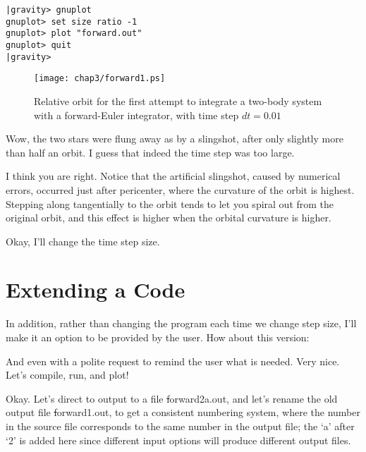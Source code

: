 \cba

\begin{small}
\begin{verbatim}
|gravity> gnuplot
gnuplot> set size ratio -1
gnuplot> plot "forward.out"
gnuplot> quit
|gravity> 
\end{verbatim}
\end{small}

\begin{figure}[ht]
\centering
\texttt{[image: chap3/forward1.ps]}
\caption[Two-body orbit with a forward-Euler integrator, time step $dt = 0.01$]
{Relative orbit for the first attempt to integrate a two-body system with a
forward-Euler integrator, with time step $dt = 0.01$}
\label{fig:forward1}
\end{figure}

\abc

\bob
Wow, the two stars were flung away as by a slingshot, after only
slightly more than half an orbit.  I guess that indeed the time step
was too large.

\alice
I think you are right.  Notice that the artificial slingshot, caused
by numerical errors, occurred just after pericenter, where the
curvature of the orbit is highest.  Stepping along tangentially to the
orbit tends to let you spiral out from the original orbit, and this
effect is higher when the orbital curvature is higher.

\carol
Okay, I'll change the time step size.

\cba

\section{Extending a Code}

\abc

\carol
In addition, rather than changing the program each time we change step
size, I'll make it an option to be provided by the user.  How about
this version:

\cba


\abc

\bob
And even with a polite request to remind the user what is needed.
Very nice.  Let's compile, run, and plot!

\carol
Okay.  Let's direct to output to a file {\st forward2a.out}, and let's
rename the old output file {\st forward1.out}, to get a consistent
numbering system, where the number in the source file corresponds to
the same number in the output file; the `a' after `2' is added here
since different input options will produce different output files.


